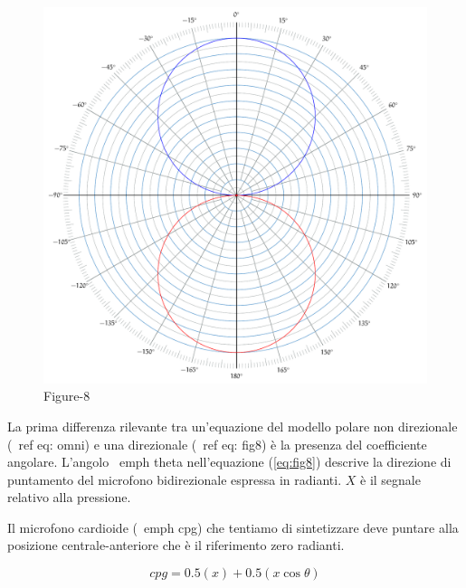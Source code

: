 \begin{figure}[h]
\centering
\includegraphics[width=1\columnwidth]{CAPITOLI/_TIKZ/POLAR/fig8}
\caption{Figure-8}
\label{polar:fig8}
\end{figure}

La prima differenza rilevante tra un'equazione del modello polare non
direzionale (\ ref {eq: omni}) e una direzionale (\ ref {eq: fig8}) è la
presenza del coefficiente angolare. L'angolo \ emph {theta} nell'equazione
(\ref{eq:fig8}) descrive la direzione di puntamento del microfono bidirezionale
espressa in radianti. $ X $ è il segnale relativo alla pressione.

Il microfono cardioide (\ emph {cpg}) che tentiamo di sintetizzare deve puntare
alla posizione centrale-anteriore che è il riferimento zero radianti.

\begin{equation}
cpg = 0.5(x) + 0.5(x\cos\theta)
\label{eq:cardioid}
\end{equation}

